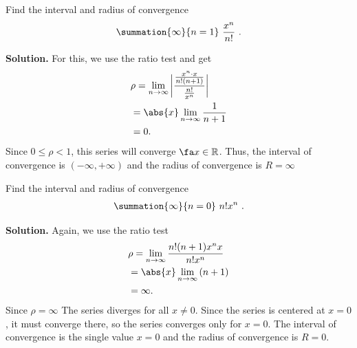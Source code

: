 \documentclass{report}
\begin{document}
    \pagebreak \bigbreak \noindent 
    \begin{eg}
        Find the interval and radius of convergence
        \begin{align*}
            \summation{\infty}{n=1}\ \frac{x^{n}}{n!}\ 
        .\end{align*}
    \end{eg}
    \bigbreak \noindent 
    \textbf{Solution.} For this, we use the ratio test and get
    \begin{align*}
        &\rho = \lim\limits_{n \to \infty}{\bigg\lvert \frac{\frac{x^{n}\cdot x}{n!(n+1)}}{\frac{n!}{x^{n}}} \bigg\rvert} \\
        &=\abs{x}\lim\limits_{n \to \infty}{\frac{1}{n+1}} \\
        &=0
    .\end{align*}
    \bigbreak \noindent 
    Since $ 0 \leq \rho  < 1$, this series will converge $\fa x \in \mathbb{R} $. Thus, the interval of convergence is $(-\infty,+\infty) $ and the radius of convergence is $R = \infty $

    \bigbreak \noindent 
    \begin{eg}
         Find the interval and radius of convergence
         \begin{align*}
             \summation{\infty}{n=0}\ n!x^{n}\ 
         .\end{align*}
    \end{eg}
    \bigbreak \noindent 
    \textbf{Solution.} Again, we use the ratio test
    \begin{align*}
        &\rho = \lim\limits_{n \to \infty}{\frac{n!(n+1)x^{n}x}{n!x^{n}}} \\
        &=\abs{x}\lim\limits_{n \to \infty}{(n+1)} \\
        &=\infty
    .\end{align*}
    \bigbreak \noindent 
    Since $\rho = \infty $ The series diverges for all \( x \neq 0 \). Since the series is centered at \( x = 0 \), it must converge there, so the series converges only for \( x = 0 \). The interval of convergence is the single value \( x = 0 \) and the radius of convergence is \( R = 0 \).
\end{document}
